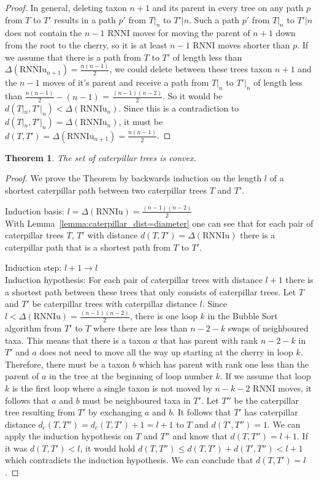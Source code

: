 \documentclass[11pt, a4paper]{article}
\newcommand{\rnni}{\mathrm{RNNI}}
\newcommand{\rnniu}{\mathrm{RNNIu}}
\newtheorem{theorem}[definition]{Theorem}
\begin{document}
\begin{proof}
    In general, deleting taxon $n+1$ and its parent in every tree on any path $p$ from $T$ to $T'$ results in a path $p'$ from $T|_n$ to $T'|n$.
    Such a path $p'$ from $T|_n$ to $T'|n$ does not contain the $n-1$ $\rnni$ moves for moving the parent of $n+1$ down from the root to the cherry, so it is at least $n-1$ $\rnni$ moves shorter than $p$.
    If we assume that there is a path from $T$ to $T'$ of length less than $\Delta(\rnniu_{n+1}) = \frac{n(n-1)}{2}$, we could delete between these trees taxon $n+1$ and the $n-1$ moves of it's parent and receive a path from $T|_n$ to $T'|_n$ of length less than $\frac{n(n-1)}{2} - (n-1)$ = $\frac{(n-1)(n-2)}{2}$.
    So it would be $d(T|_n, T'|_n) < \Delta(\rnniu_n)$.
    Since this is a contradiction to $d(T|_n, T'|_n) = \Delta(\rnniu_n)$, it must be $d(T,T') = \Delta(\rnniu_{n+1}) = \frac{n(n-1)}{2} $.

\end{proof}

\begin{theorem}
    The set of caterpillar trees is convex.
\end{theorem}

\begin{proof}
    We prove the Theorem by backwards induction on the length $l$ of a shortest caterpillar path between two caterpillar trees $T$ and $T'$.

    Induction basis: $l = \Delta(\rnniu) = \frac{(n-1)(n-2)}{2}$\\
    With Lemma~\ref{lemma:caterpillar_dist=diameter} one can see that for each pair of caterpillar trees $T$, $T'$ with distance $d(T,T') = \Delta(\rnniu)$ there is a caterpillar path that is a shortest path from $T$ to $T'$.

    Induction step: $l+1 \to l$\\
    Induction hypothesis: For each pair of caterpillar trees with distance $l+1$ there is a shortest path between these trees that only consists of caterpillar trees.
    Let $T$ and $T'$ be caterpillar trees with caterpillar distance $l$.
    Since $l < \Delta(\rnniu) = \frac{(n-1)(n-2)}{2}$, there is one loop $k$ in the Bubble Sort algorithm from $T'$ to $T$ where there are less than $n-2-k$ swaps of neighboured taxa.
    This means that there is a taxon $a$ that has parent with rank $n-2-k$ in $T'$ and $a$ does not need to move all the way up starting at the cherry in loop $k$.
    Therefore, there must be a taxon $b$ which has parent with rank one less than the parent of $a$ in the tree at the beginning of loop number $k$.
    If we assume that loop $k$ is the first loop where a single taxon is not moved by $n-k-2$ $\rnni$ moves, it follows that $a$ and $b$ must be neighboured taxa in $T'$.
    Let $T''$ be the caterpillar tree resulting from $T'$ by exchanging $a$ and $b$.
    It follows that $T'$ has caterpillar distance $d_c(T,T'') = d_c(T,T') + 1 = l+1$ to $T$ and $d(T',T'') = 1$.
    We can apply the induction hypothesis on $T$ and $T''$ and know that $d(T,T'') = l+1$.
    If it was $d(T,T') < l$, it would hold $d(T,T'') \leq d(T,T') + d(T',T'') < l + 1$ which contradicts the induction hypothesis.
    We can conclude that $d(T,T') = l$.

\end{proof}
\end{document}
